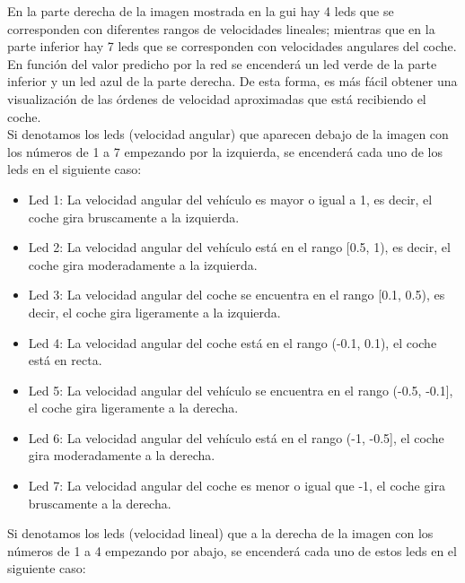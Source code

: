 En la parte derecha de la imagen mostrada en la \acrshort{gui} hay 4 leds que se corresponden con diferentes rangos de velocidades lineales; mientras que en la parte inferior hay 7 leds que se corresponden con velocidades angulares del coche. En función del valor predicho por la red se encenderá un led verde de la parte inferior y un led azul de la parte derecha. De esta forma, es más fácil obtener una visualización de las órdenes de velocidad aproximadas que está recibiendo el coche. \\

Si denotamos los leds (velocidad angular) que aparecen debajo de la imagen con los números de 1 a 7 empezando por la izquierda, se encenderá cada uno de los leds en el siguiente caso:

\begin{itemize}
    \item Led 1: La velocidad angular del vehículo es mayor o igual a 1, es decir, el coche gira bruscamente a la izquierda.
    
    \item Led 2: La velocidad angular del vehículo está en el rango [0.5, 1), es decir, el coche gira moderadamente a la izquierda.
    
    \item Led 3:  La velocidad angular del coche se encuentra en el rango [0.1, 0.5), es decir, el coche gira ligeramente a la izquierda.
    
    \item Led 4: La velocidad angular del coche está en el rango (-0.1, 0.1), el coche está en recta.
    
    \item Led 5: La velocidad angular del vehículo se encuentra en el rango (-0.5, -0.1],  el coche gira ligeramente a la derecha.
    
     \item Led 6: La velocidad angular del vehículo está en el rango (-1, -0.5], el coche gira moderadamente a la derecha.
     
     \item Led 7: La velocidad angular del coche es menor o igual que -1, el coche gira bruscamente a la derecha.
\end{itemize}

Si denotamos los leds (velocidad lineal) que a la derecha de la imagen con los números de 1 a 4 empezando por abajo, se encenderá cada uno de estos leds en el siguiente caso:

